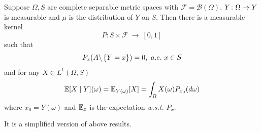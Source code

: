 \documentclass[a4paper,12pt]{article}
\begin{document}
\begin{itemize}
  \begin{thm}
    Suppose $\Omega,S$ are complete separable metric spaces with $\mathcal{F} = \mathcal{B}(\Omega)$. $Y \colon \Omega \rightarrow Y$ is measurable and $\mu$ is the distribution of $Y$ on $S$. Then there is a measurable kernel
    \begin{equation*}
      P \colon S \times \mathcal{F} ~\longrightarrow~ [0,1]
    \end{equation*}
    such that
    \begin{equation*}
      P_x(A \backslash \left\{Y=x\right\}) = 0,~a.e.~x \in S
    \end{equation*}
    and for any $X \in L^1(\Omega,S)$
    \begin{equation*}
      \mathbb{E}[X \mid Y](\omega) = \mathbb{E}_{Y(\omega)}[X] = \int_{\Omega}X(\omega)P_{x_0}(d\omega)
    \end{equation*}
    where $x_0=Y(\omega)$ and $\mathbb{E}_x$ is the expectation \emph{w.s.t.} $P_x$.
    \begin{rmk}
      It is a simplified version of above results.
    \end{rmk}
  \end{thm}
\end{itemize}
\end{document}

